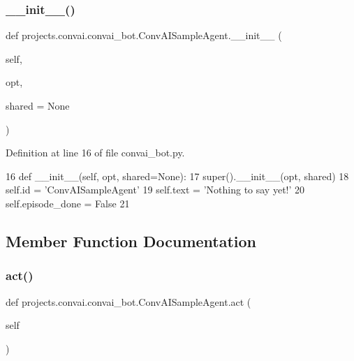 \subsubsection{\texorpdfstring{\+\_\+\+\_\+init\+\_\+\+\_\+()}{\_\_init\_\_()}}
{\footnotesize\ttfamily def projects.\+convai.\+convai\+\_\+bot.\+Conv\+A\+I\+Sample\+Agent.\+\_\+\+\_\+init\+\_\+\+\_\+ (\begin{DoxyParamCaption}\item[{}]{self,  }\item[{}]{opt,  }\item[{}]{shared = {\ttfamily None} }\end{DoxyParamCaption})}



Definition at line 16 of file convai\+\_\+bot.\+py.


\begin{DoxyCode}
16     \textcolor{keyword}{def }\_\_init\_\_(self, opt, shared=None):
17         super().\_\_init\_\_(opt, shared)
18         self.id = \textcolor{stringliteral}{'ConvAISampleAgent'}
19         self.text = \textcolor{stringliteral}{'Nothing to say yet!'}
20         self.episode\_done = \textcolor{keyword}{False}
21 
\end{DoxyCode}


\subsection{Member Function Documentation}
\mbox{\label{classprojects_1_1convai_1_1convai__bot_1_1ConvAISampleAgent_a7eec937e205e191f690adcc742bdb87c}} 
\subsubsection{\texorpdfstring{act()}{act()}}
{\footnotesize\ttfamily def projects.\+convai.\+convai\+\_\+bot.\+Conv\+A\+I\+Sample\+Agent.\+act (\begin{DoxyParamCaption}\item[{}]{self }\end{DoxyParamCaption})}



